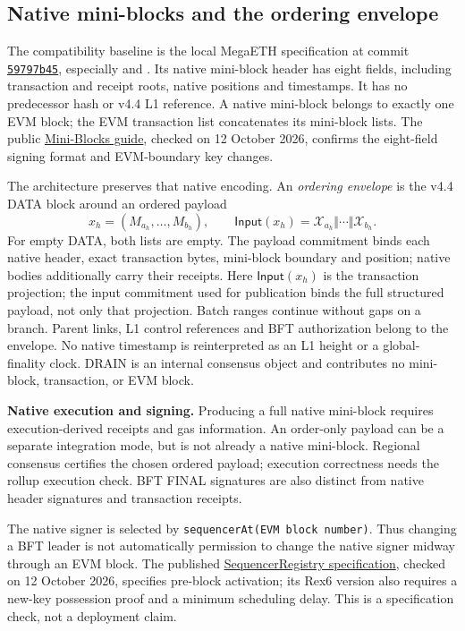 \documentclass[11pt,a4paper]{article}
\newcommand{\api}[1]{\ensuremath{\mathsf{#1}}}
\newcommand{\src}[2]{\href{../../formalization_v2/#1}{\texttt{\detokenize{#2}}}}
\begin{document}
\subsection{Native mini-blocks and the ordering envelope}\label{sec:native}
The compatibility baseline is the local MegaETH specification at commit
\href{https://github.com/megaeth-labs/specification/tree/59797b45b1f59b7c2c147e6f99be39399a1f2b44}{\texttt{59797b45}}, especially
\src{../megaeth_specs/specs/protocol/blocks.md}{blocks.md} and
\src{../megaeth_specs/specs/protocol/state-sync.md}{state-sync.md}.
Its native mini-block header has eight fields, including transaction and
receipt roots, native positions and timestamps. It has no predecessor
hash or v4.4 L1 reference. A native mini-block belongs to exactly one
EVM block; the EVM transaction list concatenates its mini-block lists.
The public \href{https://docs.megaeth.com/mini-block}{Mini-Blocks guide},
checked on 12 October 2026, confirms the eight-field signing format and
EVM-boundary key changes.

The architecture preserves that native encoding. An \emph{ordering
envelope} is the v4.4 DATA block around an ordered payload
\[
 x_h=(M_{a_h},\ldots,M_{b_h}),\qquad
 \api{Input}(x_h)=\mathcal X_{a_h}\Vert\cdots\Vert\mathcal X_{b_h}.
\]
For empty DATA, both lists are empty.
The payload commitment binds each native header, exact transaction bytes,
mini-block boundary and position; native bodies additionally carry their
receipts. Here $\api{Input}(x_h)$ is the transaction projection;
the input commitment used for publication binds the full structured
payload, not only that projection. Batch ranges continue without gaps on
a branch. Parent links,
L1 control references and BFT authorization belong to the envelope.
No native timestamp is reinterpreted as an L1 height or a global-finality
clock. DRAIN is an internal consensus object and contributes no
mini-block, transaction, or EVM block.

\textbf{Native execution and signing.} Producing a full native mini-block
requires execution-derived receipts and gas information. An order-only
payload can be a separate integration mode, but is not already a native
mini-block. Regional consensus certifies the chosen ordered payload;
execution correctness needs the rollup execution check. BFT FINAL
signatures are also distinct from native header signatures and
transaction receipts.

The native signer is selected by \texttt{sequencerAt(EVM block number)}.
Thus changing a BFT leader is not automatically permission to change
the native signer midway through an EVM block. The published
\href{https://docs.megaeth.com/spec/system-contracts/sequencer-registry}
{SequencerRegistry specification}, checked on 12 October 2026, specifies
pre-block activation; its Rex6 version also requires a new-key possession
proof and a minimum scheduling delay. This is a specification check, not
a deployment claim.
\end{document}
